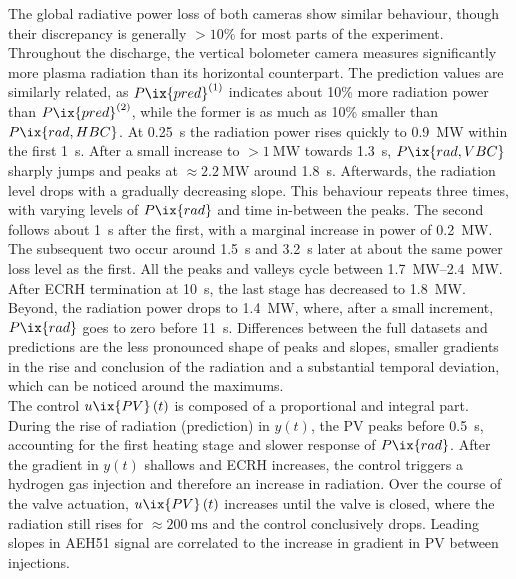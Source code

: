             The global radiative power loss of both cameras show similar behaviour, though their discrepancy is generally $>10\%$ for most parts of the experiment. Throughout the discharge, the vertical bolometer camera measures significantly more plasma radiation than its horizontal counterpart. The prediction values are similarly related, as $P\ix{pred}^{\left(1\right)}$ indicates about 10\% more radiation power than $P\ix{pred}^{\left(2\right)}$, while the former is as much as 10\% smaller than $P\ix{rad, HBC}$. At \SI{0.25}{\second} the radiation power rises quickly to \SI{0.9}{\mega\watt} within the first \SI{1}{\second}. After a small increase to $>\SI{1}{\mega\watt}$ towards \SI{1.3}{\second}, $P\ix{rad, VBC}$ sharply jumps and peaks at $\approx\SI{2.2}{\mega\watt}$ around \SI{1.8}{\second}. Afterwards, the radiation level drops with a gradually decreasing slope. This behaviour repeats three times, with varying levels of $P\ix{rad}$ and time in-between the peaks. The second follows about \SI{1}{\second} after the first, with a marginal increase in power of \SI{0.2}{\mega\watt}. The subsequent two occur around \SI{1.5}{\second} and \SI{3.2}{\second} later at about the same power loss level as the first. All the peaks and valleys cycle between \SIrange{1.7}{2.4}{\mega\watt}. After ECRH termination at \SI{10}{\second}, the last stage has decreased to \SI{1.8}{\mega\watt}. Beyond, the radiation power drops to \SI{1.4}{\mega\watt}, where, after a small increment, $P\ix{rad}$ goes to zero before \SI{11}{\second}. Differences between the full datasets and predictions are the less pronounced shape of peaks and slopes, smaller gradients in the rise and conclusion of the radiation and a substantial temporal deviation, which can be noticed around the maximums.\\%
            The control $u\ix{PV}\left(t\right)$ is composed of a proportional and integral part. During the rise of radiation (prediction) in $y\left(t\right)$, the PV peaks before \SI{0.5}{\second}, accounting for the first heating stage and slower response of $P\ix{rad}$. After the gradient in $y\left(t\right)$ shallows and ECRH increases, the control triggers a hydrogen gas injection and therefore an increase in radiation. Over the course of the valve actuation, $u\ix{PV}\left(t\right)$ increases until the valve is closed, where the radiation still rises for $\approx\SI{200}{\milli\second}$ and the control conclusively drops. Leading slopes in AEH51 signal are correlated to the increase in gradient in PV between injections.\\%
